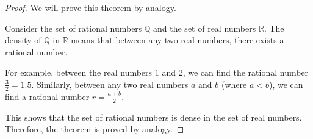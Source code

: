 \begin{proof}
	We will prove this theorem by analogy.

	Consider the set of rational numbers \( \mathbb{Q} \) and the set of real numbers \( \mathbb{R} \). The density of \( \mathbb{Q} \) in \( \mathbb{R} \) means that between any two real numbers, there exists a rational number.

	For example, between the real numbers \( 1 \) and \( 2 \), we can find the rational number \( \frac{3}{2} = 1.5 \). Similarly, between any two real numbers \( a \) and \( b \) (where \( a < b \)), we can find a rational number \( r = \frac{a + b}{2} \).

	This shows that the set of rational numbers is dense in the set of real numbers.
	Therefore, the theorem is proved by analogy.
\end{proof}
\newpage


